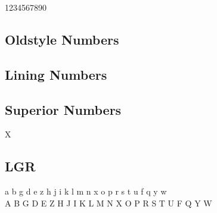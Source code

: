 \documentclass{article}
\begin{document}
1234567890

\subsection*{Oldstyle Numbers}

{}

\subsection*{Lining Numbers}

{}

\subsection*{Superior Numbers}

X{}

\subsection*{LGR}

{\firamonolgr\noindent
 a b g d e z h j i k l m n x o p r s t u f q y w\\
 A B G D E Z H J I K L M N X O P R S T U F Q Y W
}
\end{document}
